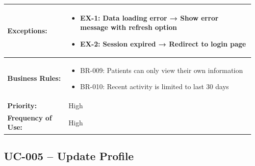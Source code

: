 \documentclass[12pt,a4paper]{article}
\begin{document}
\begin{longtable}{|p{4.5cm}|p{10.5cm}|}
\hline
\textbf{Exceptions:} &
\begin{itemize}
  \item EX-1: Data loading error → Show error message with refresh option
  \item EX-2: Session expired → Redirect to login page
\end{itemize} \\
\hline
\textbf{Business Rules:} &
\begin{itemize}
  \item BR-009: Patients can only view their own information
  \item BR-010: Recent activity is limited to last 30 days
\end{itemize} \\
\hline
\textbf{Priority:} & High \\
\hline
\textbf{Frequency of Use:} & High \\
\hline
\end{longtable}

\subsection{UC-005 – Update Profile}
\end{document}
